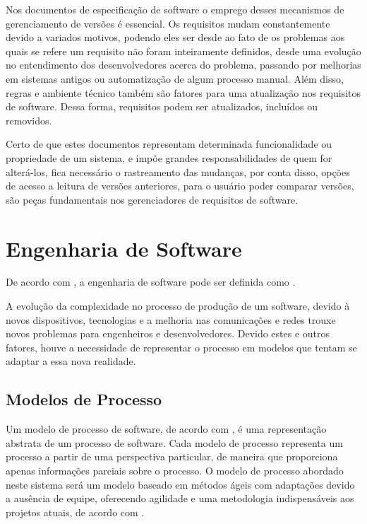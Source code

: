 \newpage

Nos documentos de especificação de software o emprego desses
mecanismos de gerenciamento de versões é essencial. Os requisitos mudam
constantemente devido a variados motivos, podendo eles ser desde ao fato de os problemas aos quais se refere um requisito não foram inteiramente definidos, desde uma evolução no entendimento dos desenvolvedores acerca do problema, passando por melhorias em sistemas antigos ou automatização de algum processo manual. Além disso, regras e ambiente técnico também são fatores para uma atualização nos requisitos de software. Dessa forma, requisitos podem ser atualizados, incluídos ou removidos.

Certo de que estes documentos representam determinada funcionalidade ou
propriedade de um sistema, e impõe grandes responsabilidades de quem for alterá-los, fica necessário o rastreamento das mudanças, por conta disso, opções de acesso a leitura de versões anteriores, para o usuário poder comparar versões, são peças fundamentais nos gerenciadores de requisitos de software. 

\section{Engenharia de Software}

De acordo com \cite{pressman2016engenharia}, a engenharia de software pode ser definida como .

A evolução da complexidade no processo de produção de um software, devido à novos dispositivos, tecnologias e a melhoria nas comunicações e redes trouxe novos problemas para engenheiros e desenvolvedores. Devido estes e outros fatores, houve a necessidade de representar o processo em modelos que tentam se adaptar a essa nova realidade.

\subsection{Modelos de Processo}

Um modelo de processo de software, de acordo com \cite{sommerville2011software}, é uma representação abstrata de um processo de software. Cada modelo de processo representa um processo a partir de uma perspectiva particular, de maneira que proporciona apenas
informações parciais sobre o processo. O modelo de processo abordado neste sistema será um modelo baseado em métodos ágeis com adaptações devido a ausência de equipe, oferecendo agilidade e uma metodologia indispensáveis aos projetos atuais, de acordo com \cite{beck2001manifesto}.

